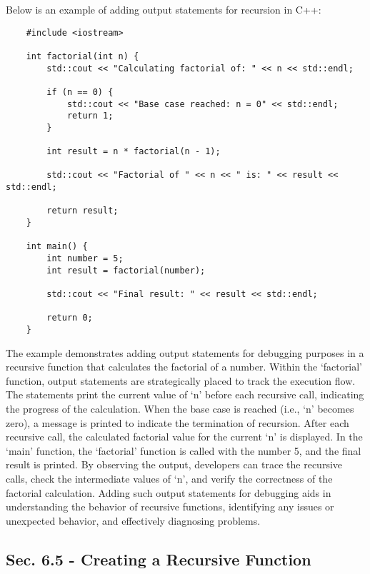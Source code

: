 \begin{solution}
    Below is an example of adding output statements for recursion in C++:

    \horizontalline

    \begin{verbatim}
    #include <iostream>

    int factorial(int n) {
        std::cout << "Calculating factorial of: " << n << std::endl;
    
        if (n == 0) {
            std::cout << "Base case reached: n = 0" << std::endl;
            return 1;
        }
    
        int result = n * factorial(n - 1);
    
        std::cout << "Factorial of " << n << " is: " << result << std::endl;
    
        return result;
    }
    
    int main() {
        int number = 5;
        int result = factorial(number);
    
        std::cout << "Final result: " << result << std::endl;
    
        return 0;
    }
    \end{verbatim}

    \horizontalline

    The example demonstrates adding output statements for debugging purposes in a recursive function that calculates the factorial of a number. Within the `factorial' function, output statements are strategically placed to track the execution flow. The statements print the current value of `n' before each recursive call, 
    indicating the progress of the calculation. When the base case is reached (i.e., `n' becomes zero), a message is printed to indicate the termination of recursion. After each recursive call, the calculated factorial value for the current `n' is displayed. In the `main' function, the `factorial' function is called with 
    the number 5, and the final result is printed. By observing the output, developers can trace the recursive calls, check the intermediate values of `n', and verify the correctness of the factorial calculation. Adding such output statements for debugging aids in understanding the behavior of recursive functions, identifying 
    any issues or unexpected behavior, and effectively diagnosing problems.
\end{solution}

\subsection*{Sec. 6.5 - Creating a Recursive Function}

